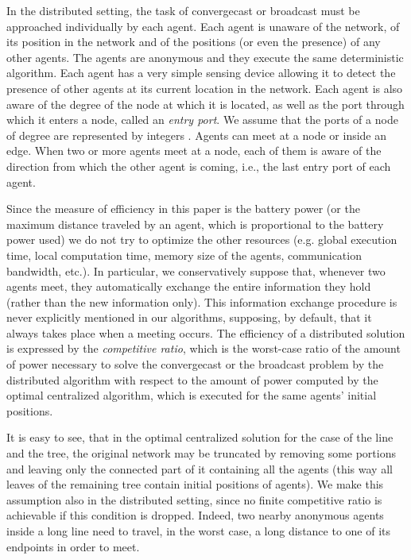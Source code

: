 \documentclass{article}
\newcommand\convergecast{convergecast\xspace}
\begin{document}
In the distributed setting, the task of \convergecast or broadcast must be approached individually by each agent.
Each agent is unaware of the network, of its position in the network and of the positions (or even the presence) of any other agents. The agents are anonymous and they execute the same deterministic algorithm. Each agent has a very simple sensing device allowing it to detect the presence of other agents at its current location in the network. Each agent is also aware of the degree of the node at which it is located, as well as the port through which it enters a node, called an \emph{entry port}. We assume that the ports of a node of degree  are represented by integers . Agents can meet at a node or inside an edge. When two or more agents meet at a node, each of them is aware of the direction from which the other agent is coming, i.e., the last entry port of each agent.

Since the measure of efficiency in this paper is the battery power (or the maximum distance traveled by an agent, which is proportional to the battery power used) we do not try to optimize the other resources (e.g. global execution time, local computation time, memory size of the agents, communication bandwidth, etc.). In particular, we conservatively suppose that, whenever two agents meet, they automatically exchange the entire information they hold (rather than the new information only). This information exchange procedure is never explicitly mentioned in our algorithms, supposing, by default, that it always takes place when a meeting occurs. The efficiency of a distributed solution is expressed by the {\em competitive ratio}, which is the worst-case ratio of the amount of power necessary to solve the {\convergecast} or the broadcast problem by the distributed algorithm with respect to the amount of power computed by the optimal centralized algorithm, which is executed for the same agents' initial positions. 

It is easy to see, that in the optimal centralized solution for the case of the line and the tree, the original network may be truncated by removing some portions and leaving only the connected part of it containing all the agents (this way all leaves of the remaining tree contain initial positions of agents). We make this assumption also in the distributed setting, since no finite competitive ratio is achievable if this condition is dropped. Indeed, two nearby anonymous agents inside a long line need to travel, in the worst case, a long distance to one of its endpoints in order to meet.
\end{document}
